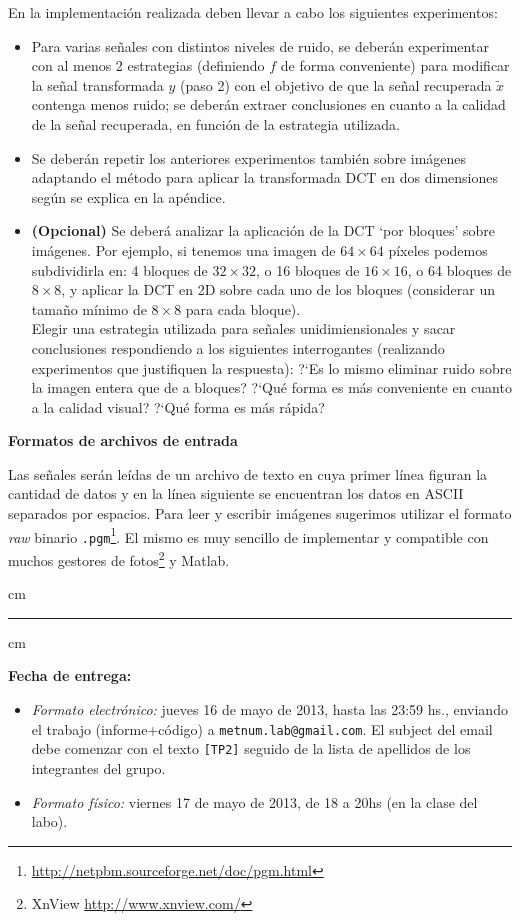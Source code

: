 En la implementaci\'on realizada deben llevar a cabo los siguientes experimentos:
\begin{itemize}
\item Para varias se\~nales con distintos niveles de ruido, se deber\'an experimentar con al menos 2 estrategias (definiendo $f$ de forma conveniente) para modificar la se\~nal transformada $y$ (paso 2) con el objetivo de que la se\~nal recuperada $\tilde{x}$ contenga menos ruido; se deber\'an extraer conclusiones en cuanto a la calidad de la se\~nal recuperada, en funci\'on de la estrategia utilizada.
\item Se deber\'an repetir los anteriores experimentos tambi\'en sobre im\'agenes adaptando el m\'etodo para aplicar la transformada DCT en dos dimensiones seg\'un se explica en la ap\'endice. 
\item {\bf (Opcional)} Se deber\'a analizar la aplicaci\'on de la DCT `por bloques' sobre im\'agenes. Por ejemplo, si tenemos una imagen de $64\times 64$ p\'ixeles podemos subdividirla en: 4 bloques de $32\times 32$, o 16 bloques de $16\times 16$, o 64 bloques de $8\times 8$, y aplicar la DCT en 2D sobre cada uno de los bloques (considerar un tama\~no m\'inimo de $8\times 8$ para cada bloque).\\ 
Elegir una estrategia utilizada para se\~nales unidimiensionales y sacar conclusiones respondiendo a los siguientes interrogantes (realizando experimentos que justifiquen la respuesta): ?`Es lo mismo eliminar ruido sobre la imagen entera que de a bloques? ?`Qu\'e forma es m\'as conveniente en cuanto a la calidad visual? ?`Qu\'e forma es m\'as r\'apida? 
\end{itemize}

{\bf Formatos de archivos de entrada}

Las se\~nales ser\'an le\'idas de un archivo de texto en cuya primer l\'inea figuran la cantidad de datos y en la l\'inea siguiente se encuentran los datos en ASCII separados por espacios. Para leer y escribir im\'agenes sugerimos utilizar el formato {\em raw} binario \texttt{.pgm}\footnote{\url{http://netpbm.sourceforge.net/doc/pgm.html}}. 
El mismo es muy sencillo de implementar y compatible con muchos gestores de fotos\footnote{XnView \url{http://www.xnview.com/}} y Matlab.

 cm
\hrule
{} cm

{\bf Fecha de entrega:} 
\begin{itemize}
\item \textsl{Formato electr\'onico:} jueves 16 de mayo de 2013, hasta las 23:59 hs., enviando el trabajo (informe+c\'odigo) a \texttt{metnum.lab@gmail.com}. El subject del email debe comenzar con el texto \verb|[TP2]| seguido de la lista de apellidos de los integrantes del grupo. 
\item \textsl{Formato f\'isico:} viernes 17 de mayo de 2013, de 18 a 20hs (en la clase del labo).
\end{itemize}


